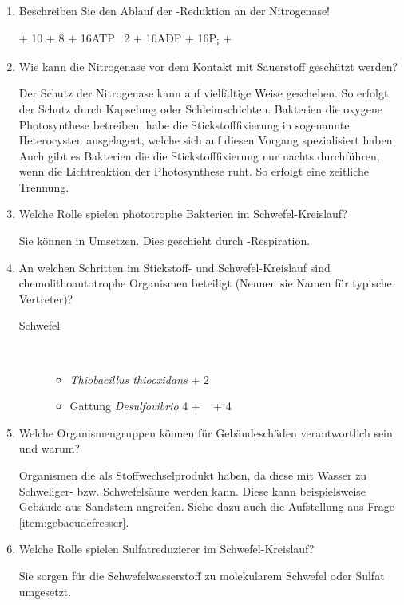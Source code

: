 \begin{enumerate}
	\item Beschreiben Sie den Ablauf der -Reduktion an der Nitrogenase!

		\begin{center}
			 + 10 + 8 + 16ATP \textrightarrow \ 2 + 16ADP + 16P\textsubscript{i} + 
		\end{center}

	\item Wie kann die Nitrogenase vor dem Kontakt mit Sauerstoff geschützt werden?

		Der Schutz der Nitrogenase kann auf vielfältige Weise geschehen.
		So erfolgt der Schutz durch Kapselung oder Schleimschichten.
		Bakterien die oxygene Photosynthese betreiben,
		habe die Stickstofffixierung in sogenannte Heterocysten ausgelagert,
		welche sich auf diesen Vorgang spezialisiert haben.
		Auch gibt es Bakterien die die Stickstofffixierung nur nachts durchführen,
		wenn die Lichtreaktion der Photosynthese ruht.
		So erfolgt eine zeitliche Trennung.

	\item Welche Rolle spielen phototrophe Bakterien im Schwefel-Kreislauf?

		Sie können  in  Umsetzen.
		Dies geschieht durch -Respiration.

	\item An welchen Schritten im Stickstoff- und Schwefel-Kreislauf sind chemolithoautotrophe Organismen beteiligt (Nennen sie Namen für typische Vertreter)?
		\label{item:gebaeudefresser}

		\begin{description}
			\item[Schwefel] \hfill \\
				\begin{itemize}
					\item \emph{Thiobacillus thiooxidans} \hfill {} + 2  \textrightarrow \ 
					\item Gattung \emph{Desulfovibrio} \hfill 4 +  \textrightarrow \  + 4 
				\end{itemize}
		\end{description}

	\item Welche Organismengruppen können für Gebäudeschäden verantwortlich sein und warum?
		
		Organismen die als Stoffwechselprodukt  haben,
		da diese mit Wasser zu Schweliger- bzw. Schwefelsäure werden kann.
		Diese kann beispielsweise Gebäude aus Sandstein angreifen.
		Siehe dazu auch die Aufstellung aus Frage \ref{item:gebaeudefresser}.

	\item Welche Rolle spielen Sulfatreduzierer im Schwefel-Kreislauf?

		Sie sorgen für die Schwefelwasserstoff zu molekularem Schwefel oder Sulfat umgesetzt.

\end{enumerate}
